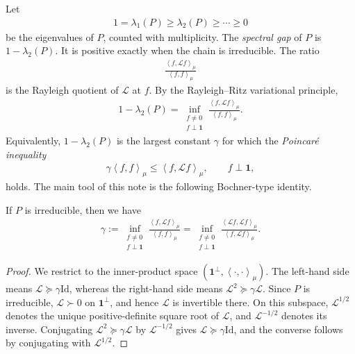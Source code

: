 \documentclass[a4paper,12pt]{article}
\theoremstyle{plain}
\theoremstyle{definition}
\def\*#1{\mathbf{#1}} %
\def\+#1{\mathcal{#1}} %
\def\*#1{\boldsymbol{#1}} %
\def\+#1{\mathcal{#1}} %
\newcommand{\inner}[2]{\left\langle #1,#2\right\rangle}
\begin{document}
Let
\begin{align*}
  1=\lambda_1(P)\geq\lambda_2(P)\geq\cdots\geq0
\end{align*}
be the eigenvalues of $P$, counted with multiplicity.  The
\emph{spectral gap} of $P$ is $1-\lambda_2(P)$.  It is positive exactly
when the chain is irreducible.  The ratio
\begin{align*}
  \frac{\inner{f}{\+L f}_\mu}{\inner{f}{f}_\mu}
\end{align*}
is the Rayleigh quotient of $\+L$ at $f$.  By the Rayleigh--Ritz
variational principle,
\begin{align*}
  1-\lambda_2(P)
  =\inf_{\substack{f\neq0\\f\perp\*1}}
    \frac{\inner{f}{\+L f}_\mu}{\inner{f}{f}_\mu}.
\end{align*}
Equivalently, $1-\lambda_2(P)$ is the largest constant $\gamma$ for
which the \emph{Poincar{\'e} inequality}
\begin{align*}
  \gamma\inner{f}{f}_\mu\leq\inner{f}{\+L f}_\mu,
  \qquad f\perp\*1,
\end{align*}
holds.
%
The main tool of this note is the following Bochner-type identity.
\begin{proposition} \label{prop:Bochner-identity}
  If $P$ is irreducible, then we have
  \begin{align*}
    \gamma
    :=\inf_{\substack{f\neq0\\f\perp\*1}}
      \frac{\inner{f}{\+L f}_\mu}{\inner{f}{f}_\mu}
    =\inf_{\substack{f\neq0\\f\perp\*1}}
      \frac{\inner{\+L f}{\+L f}_\mu}{\inner{f}{\+L f}_\mu}.
  \end{align*}
\end{proposition}
\begin{proof}
  We restrict to the inner-product space
  $(\*1^\perp,\inner{\cdot}{\cdot}_\mu)$.
  The left-hand side means
  $\+L\succeq\gamma\mathrm{Id}$, whereas the right-hand side means
  $\+L^2\succeq\gamma\+L$.  Since $P$ is irreducible,
  $\+L\succ0$ on $\*1^\perp$, and hence $\+L$ is invertible there.  On
  this subspace, $\+L^{1/2}$ denotes the unique positive-definite square
  root of $\+L$, and $\+L^{-1/2}$ denotes its inverse.  Conjugating
  $\+L^2\succeq\gamma\+L$ by $\+L^{-1/2}$ gives
  $\+L\succeq\gamma\mathrm{Id}$, and the converse follows by conjugating
  with $\+L^{1/2}$.
\end{proof}
\end{document}
